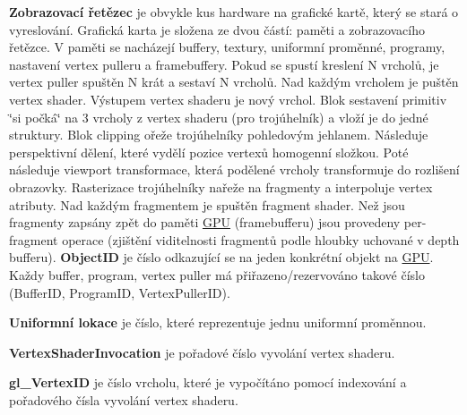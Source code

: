 {\bfseries Zobrazovací řetězec} je obvykle kus hardware na grafické kartě, který se stará o vyreslování. Grafická karta je složena ze dvou částí\+: paměti a zobrazovacího řetězce. V paměti se nacházejí buffery, textury, uniformní proměnné, programy, nastavení vertex pulleru a framebuffery. Pokud se spustí kreslení N vrcholů, je vertex puller spuštěn N krát a sestaví N vrcholů. Nad každým vrcholem je puštěn vertex shader. Výstupem vertex shaderu je nový vrchol. Blok sestavení primitiv \char`\"{}si počká\char`\"{} na 3 vrcholy z vertex shaderu (pro trojúhelník) a vloží je do jedné struktury. Blok clipping ořeže trojúhelníky pohledovým jehlanem. Následuje perspektivní dělení, které vydělí pozice vertexů homogenní složkou. Poté následuje viewport transformace, která podělené vrcholy transformuje do rozlišení obrazovky. Rasterizace trojúhelníky nařeže na fragmenty a interpoluje vertex atributy. Nad každým fragmentem je spuštěn fragment shader. Než jsou fragmenty zapsány zpět do paměti \hyperlink{structGPU}{G\+PU} (framebufferu) jsou provedeny per-\/fragment operace (zjištění viditelnosti fragmentů podle hloubky uchované v depth bufferu).  {\bfseries Object\+ID} je číslo odkazující se na jeden konkrétní objekt na \hyperlink{structGPU}{G\+PU}. Každy buffer, program, vertex puller má přiřazeno/rezervováno takové číslo (Buffer\+ID, Program\+ID, Vertex\+Puller\+ID).

{\bfseries Uniformní lokace} je číslo, které reprezentuje jednu uniformní proměnnou.

{\bfseries Vertex\+Shader\+Invocation} je pořadové číslo vyvolání vertex shaderu.

{\bfseries gl\+\_\+\+Vertex\+ID} je číslo vrcholu, které je vypočítáno pomocí indexování a pořadového čísla vyvolání vertex shaderu.

